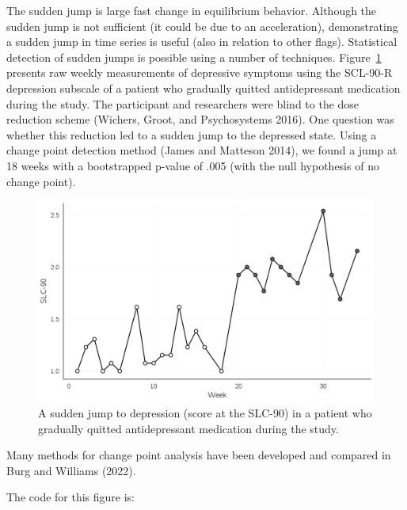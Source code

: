\documentclass[
  a4paper,
  DIV=11,
  numbers=noendperiod]{scrreprt}
\begin{document}
The sudden jump is large fast change in equilibrium behavior. Although
the sudden jump is not sufficient (it could be due to an acceleration),
demonstrating a sudden jump in time series is useful (also in relation
to other flags). Statistical detection of sudden jumps is possible using
a number of techniques. Figure~\ref{fig-ch3-img19-old-31} presents raw
weekly measurements of depressive symptoms using the SCL-90-R depression
subscale of a patient who gradually quitted antidepressant medication
during the study. The participant and researchers were blind to the dose
reduction scheme (Wichers, Groot, and Psychosystems 2016). One question
was whether this reduction led to a sudden jump to the depressed state.
Using a change point detection method (James and Matteson 2014), we
found a jump at 18 weeks with a bootstrapped p-value of .005 (with the
null hypothesis of no change point).

\begin{figure}

{\centering \includegraphics{media/ch3/fig-ch3-img19-old-31.jpg}

}

\caption{\label{fig-ch3-img19-old-31}A sudden jump to depression (score
at the SLC-90) in a patient who gradually quitted antidepressant
medication during the study.}

\end{figure}

Many methods for change point analysis have been developed and compared
in Burg and Williams (2022).

The code for this figure is:
\end{document}
